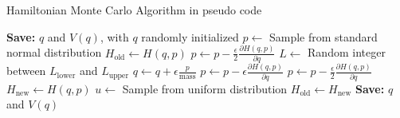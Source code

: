 \begin{algorithm}
	\caption{Hamiltonian Monte Carlo Algorithm in pseudo code}
	\begin{algorithmic}[1]
		\State \textbf{Save:} $q$ and $V(q)$, with $q$ randomly initialized
		\State $p \gets$ Sample from standard normal distribution
		\State $H_{\text{old}} \gets H(q, p)$
		\State $p \gets p - \frac{\epsilon}{2} \frac{\partial H(q,p)}{\partial q}$
		\State $L \gets$ Random integer between $L_{\text{lower}}$ and $L_{\text{upper}}$
		\State $q \gets q + \epsilon \frac{p}{\text{mass}}$
		\State $p \gets p - \epsilon \frac{\partial H(q,p)}{\partial q}$
		\EndIf
		\EndFor
		\State $p \gets p - \frac{\epsilon}{2} \frac{\partial H(q,p)}{\partial q}$
		\State $H_{\text{new}} \gets H(q, p)$
		\State $u \gets$ Sample from uniform distribution
		\State $H_{\text{old}} \gets H_{\text{new}}$
		\State \textbf{Save:} $q$ and $V(q)$
		\EndIf
		\EndFor
	\end{algorithmic}
	\label{alg:HMC}
\end{algorithm}

